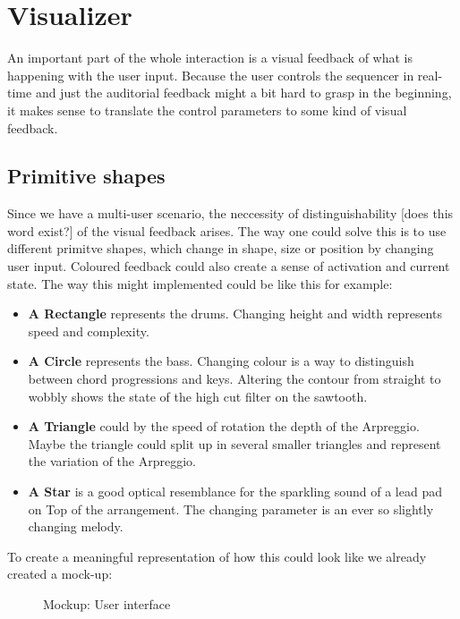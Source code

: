 \documentclass[titlepage, a4paper, 11pt]{scrartcl}
\begin{document}
\section{Visualizer}

An important part of the whole interaction is a visual feedback of what is happening with the user input. Because the user 
controls the sequencer in real-time and just the auditorial feedback might a bit hard to grasp in the beginning, it makes sense to 
translate the control parameters to some kind of visual feedback.


\subsection{Primitive shapes}

Since we have a multi-user scenario, the neccessity of distinguishability [does this word exist?] of the visual feedback arises.
The way one could solve this is to use different primitve shapes, which change in shape, size or position by changing user input.
Coloured feedback could also create a sense of activation and current state. 
The way this might implemented could be like this for example:

\begin{itemize}
    \item \textbf{A Rectangle} represents the drums. Changing height and width represents speed and complexity.
    \item \textbf{A Circle} represents the bass. Changing colour is a way to distinguish between chord progressions and keys. Altering the contour from straight to wobbly shows the state of the high cut filter on the sawtooth.
    \item \textbf{A Triangle} could by the speed of rotation the depth of the Arpreggio. Maybe the triangle could split up in several smaller triangles and represent the variation of the Arpreggio.
    \item \textbf{A Star} is a good optical resemblance for the sparkling sound of a lead pad on Top of the arrangement. The changing parameter is an ever so slightly changing melody.
\end{itemize}

To create a meaningful representation of how this could look like we already created a mock-up:

\begin{figure}[H]
    \centering
    \caption{Mockup: User interface}
    \label{fig:Mockup}
\end{figure}
\end{document}

